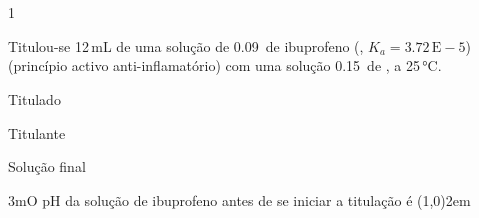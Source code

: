 \setcounter{part}{2}
\part{}

\begin{questionBox}1{}
    
    Titulou-se 12\,\unit{\milli\liter} de uma solução de 0.09\,\unit{\molar} de ibuprofeno (, \(K_a= 3.72\,\mathrm{E}-5\)) (princípio activo anti-inflamatório) com uma solução 0.15\,\unit{\molar} de , a 25\,\unit{\celsius}.


    \begin{enumerate}
        \begin{multicols}{3}
            \item Titulado
            \item Titulante
            \item Solução final
        \end{multicols}
    \end{enumerate}

    \begin{questionBox}3m{O pH da solução de ibuprofeno antes de se iniciar a titulação é \line(1,0){2em}}

                




                    

\end{questionBox}
\end{questionBox}
